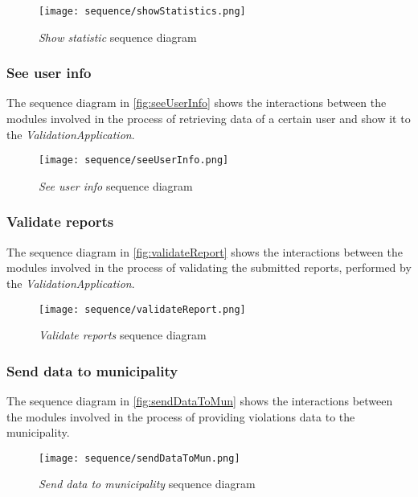 \begin{figure}[h!]
	\centering
	\texttt{[image: sequence/showStatistics.png]}
	\caption{
		\label{fig:showStatistics} 
		\emph{Show statistic} sequence diagram
	}
\end{figure}

\clearpage
\subsubsection{See user info}
The sequence diagram in \autoref{fig:seeUserInfo} shows the interactions between the modules involved in the process of retrieving data of a certain user and show it to the \emph{ValidationApplication}.\\

\begin{figure}[h!]
	\centering
	\texttt{[image: sequence/seeUserInfo.png]}
	\caption{
		\label{fig:seeUserInfo} 
		\emph{See user info} sequence diagram
	}
\end{figure}
\clearpage

\subsubsection{Validate reports}
The sequence diagram in \autoref{fig:validateReport} shows the interactions between the modules involved in the process of validating the submitted reports, performed by the \emph{ValidationApplication}.\\

\begin{figure}[h!]
	\centering
	\texttt{[image: sequence/validateReport.png]}
	\caption{
		\label{fig:validateReport} 
		\emph{Validate reports} sequence diagram
	}
\end{figure}
\clearpage

\subsubsection{Send data to municipality}
The sequence diagram in \autoref{fig:sendDataToMun} shows the interactions between the modules involved in the process of providing violations data to the municipality.\\

\begin{figure}[h!]
	\centering
	\texttt{[image: sequence/sendDataToMun.png]}
	\caption{
		\label{fig:sendDataToMun} 
		\emph{Send data to municipality} sequence diagram
	}
\end{figure}
\clearpage


